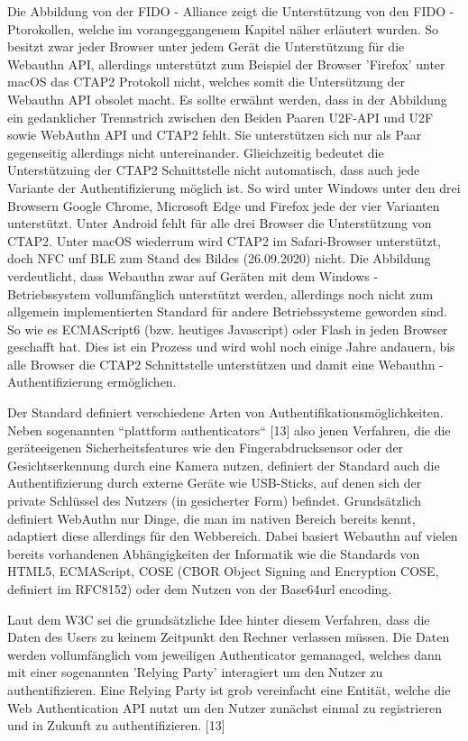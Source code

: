 Die Abbildung von der FIDO - Alliance zeigt die Unterstützung von den FIDO - Ptorokollen, welche im vorangeggangenem Kapitel näher erläutert wurden. So besitzt zwar jeder Browser unter jedem Gerät die Unterstützung für die Webauthn API, allerdings unterstützt zum Beispiel der Browser 'Firefox' unter macOS das CTAP2 Protokoll nicht, welches somit die Untersützung der Webauthn API obsolet macht. Es sollte erwähnt werden, dass in der Abbildung ein gedanklicher Trennstrich zwischen den Beiden Paaren U2F-API und U2F sowie WebAuthn API und CTAP2 fehlt. Sie unterstützen sich nur als Paar gegenseitig allerdings nicht untereinander. Glieichzeitig bedeutet die Unterstützuing der CTAP2 Schnittstelle nicht automatisch, dass auch jede Variante der Authentifizierung möglich ist. So wird unter Windows unter den drei Browsern Google Chrome, Microsoft Edge und Firefox jede der vier Varianten unterstützt. Unter Android fehlt für alle drei Browser die Unterstützung von CTAP2. Unter macOS wiederrum wird CTAP2 im Safari-Browser unterstützt, doch NFC unf BLE zum Stand des Bildes (26.09.2020) nicht. Die Abbildung verdeutlicht, dass Webauthn zwar auf Geräten mit dem Windows - Betriebssystem vollumfänglich unterstützt werden, allerdings noch nicht zum allgemein implementierten Standard für andere Betriebssysteme geworden sind. So wie es ECMAScript6 (bzw. heutiges Javascript) oder Flash in jeden Browser geschafft hat. Dies ist ein Prozess und wird wohl noch einige Jahre andauern, bis alle Browser die CTAP2 Schnittstelle unterstützen und damit eine Webauthn - Authentifizierung ermöglichen.

Der Standard definiert verschiedene Arten von Authentifikationsmöglichkeiten. Neben sogenannten ``plattform authenticators`` [13] also jenen Verfahren, die die geräteeigenen Sicherheitsfeatures wie den Fingerabdrucksensor oder der Gesichtserkennung durch eine Kamera nutzen, definiert der Standard auch die Authentifizierung durch externe Geräte wie USB-Sticks, auf denen sich der private Schlüssel des Nutzers (in gesicherter Form) befindet. Grundsätzlich definiert WebAuthn nur Dinge, die man im nativen Bereich bereits kennt, adaptiert diese allerdings für den Webbereich. Dabei basiert Webauthn auf vielen bereits vorhandenen Abhängigkeiten der Informatik wie die Standards von HTML5, ECMAScript, COSE (CBOR Object Signing and Encryption COSE, definiert im RFC8152) oder dem Nutzen von der Base64url encoding.
\newpage

Laut dem W3C sei die grundsätzliche Idee hinter diesem Verfahren, dass die Daten des Users zu keinem Zeitpunkt den Rechner verlassen müssen. Die Daten werden vollumfänglich vom jeweiligen Authenticator gemanaged, welches dann mit einer sogenannten 'Relying Party' interagiert um den Nutzer zu authentifizieren. Eine Relying Party ist grob vereinfacht eine Entität, welche die Web Authentication API nutzt um den Nutzer zunächst einmal zu registrieren und in Zukunft zu authentifizieren. [13]

